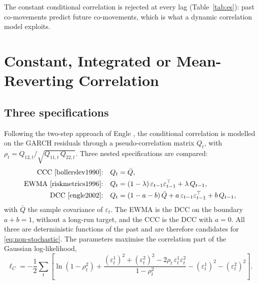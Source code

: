 \documentclass[11pt,a4paper]{article}
\begin{document}
The constant conditional correlation is rejected at every lag (Table~\ref{tab:es}): past co-movements predict
future co-movements, which is what a dynamic correlation model exploits.

\section{Constant, Integrated or Mean-Reverting Correlation}\label{sec:conditional}

\subsection{Three specifications}
Following the two-step approach of Engle \cite{engle2002}, the conditional correlation is modelled on the GARCH
residuals through a pseudo-correlation matrix $Q_t$, with $\rho_t = Q_{12,t} / \sqrt{Q_{11,t}\,Q_{22,t}}$. Three
nested specifications are compared:
\begin{align}
\text{CCC \cite{bollerslev1990}:} \quad & Q_t = \bar Q, \\
\text{EWMA \cite{riskmetrics1996}:} \quad & Q_t = (1 - \lambda)\,\varepsilon_{t-1}\varepsilon_{t-1}^\top + \lambda\,Q_{t-1}, \\
\text{DCC \cite{engle2002}:} \quad & Q_t = (1 - a - b)\,\bar Q + a\,\varepsilon_{t-1}\varepsilon_{t-1}^\top + b\,Q_{t-1},
\end{align}
with $\bar Q$ the sample covariance of $\varepsilon_t$. The EWMA is the DCC on the boundary $a + b = 1$, without a
long-run target, and the CCC is the DCC with $a = 0$. All three are deterministic functions of the past and are
therefore candidates for \eqref{eq:non-stochastic}. The parameters maximise the correlation part of the Gaussian
log-likelihood,
\begin{equation}
\ell_C = -\frac12 \sum_{t} \left[\ln(1 - \rho_t^2) + \frac{(\varepsilon^1_t)^2 + (\varepsilon^2_t)^2
- 2\rho_t\,\varepsilon^1_t\varepsilon^2_t}{1 - \rho_t^2} - (\varepsilon^1_t)^2 - (\varepsilon^2_t)^2\right].
\end{equation}
\end{document}

